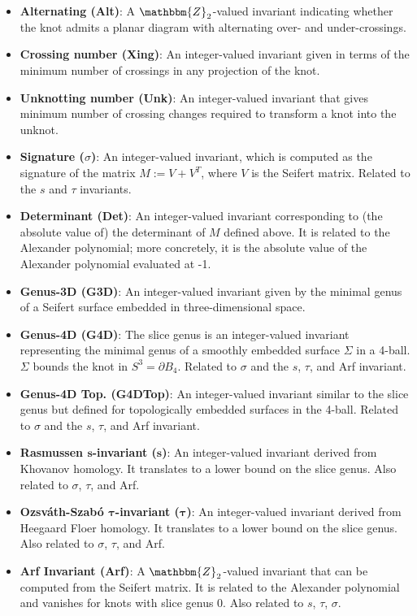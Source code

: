 \documentclass[11pt]{article}
\numberwithin{equation}{section}
\begin{document}
\begin{itemize}
    \item \textbf{Alternating (Alt)}: A $\mathbbm{Z}_2$-valued invariant indicating whether the knot admits a planar diagram with alternating over- and under-crossings.
    \item \textbf{Crossing number (Xing)}: An integer-valued invariant given in terms of the minimum number of crossings in any projection of the knot.
    \item \textbf{Unknotting number (Unk)}: An integer-valued invariant that gives minimum number of crossing changes required to transform a knot into the unknot.
    \item \textbf{Signature ($\sigma$)}: An integer-valued invariant, which is computed as the signature of the matrix $M:=V+V^T$, where $V$ is the Seifert matrix. Related to the $s$ and $\tau$ invariants.
    \item \textbf{Determinant (Det)}: An integer-valued invariant corresponding to (the absolute value of) the determinant of $M$ defined above. It is related to the Alexander polynomial; more concretely, it is the absolute value of the Alexander polynomial evaluated at -1.
    \item \textbf{Genus-3D (G3D)}: An integer-valued invariant given by the minimal genus of a Seifert surface embedded in three-dimensional space.
    \item \textbf{Genus-4D (G4D)}: The slice genus is an integer-valued invariant representing the minimal genus of a smoothly embedded surface $\Sigma$ in a 4-ball. $\Sigma$ bounds the knot in $S^3=\partial B_4$. Related to $\sigma$ and the $s$, $\tau$, and Arf invariant.
    \item \textbf{Genus-4D Top. (G4DTop)}: An integer-valued invariant similar to the slice genus but defined for topologically embedded surfaces in the 4-ball.  Related to $\sigma$ and the $s$, $\tau$, and Arf invariant.
    \item \textbf{Rasmussen $\boldsymbol{s}$-invariant ($\boldsymbol{s}$)}: An integer-valued invariant derived from Khovanov homology. It translates to a lower bound on the slice genus. Also related to $\sigma$, $\tau$, and Arf.
    \item \textbf{Ozsv\'{a}th-Szab\'{o} $\boldsymbol{\tau}$-invariant ($\boldsymbol{\tau}$)}: An integer-valued invariant derived from Heegaard Floer homology. It translates to a lower bound on the slice genus. Also related to $\sigma$, $\tau$, and Arf.
    \item \textbf{Arf Invariant (Arf)}: A $\mathbbm{Z}_2$-valued invariant that can be computed from the Seifert matrix. It  is related to the Alexander polynomial and vanishes for knots with slice genus 0. Also related to $s$, $\tau$, $\sigma$.

\end{itemize}
\end{document}
